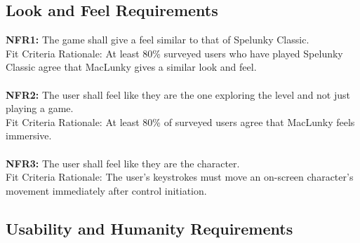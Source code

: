 \documentclass[12pt, titlepage]{article}
\begin{document}
\subsection{Look and Feel Requirements}
\textbf{NFR1:} The game shall give a feel similar to that of Spelunky Classic.\\
Fit Criteria Rationale: At least 80\% surveyed users who have played Spelunky Classic agree that MacLunky gives a similar look and feel.\\\\
\textbf{NFR2:} The user shall feel like they are the one exploring the level and not just playing a game.\\
Fit Criteria Rationale: At least 80\% of surveyed users agree that MacLunky feels immersive.\\\\
\textbf{NFR3:} The user shall feel like they are the character.\\
Fit Criteria Rationale: The user's keystrokes must move an on-screen character's movement immediately after control initiation.\\

\subsection{Usability and Humanity Requirements}
\end{document}
